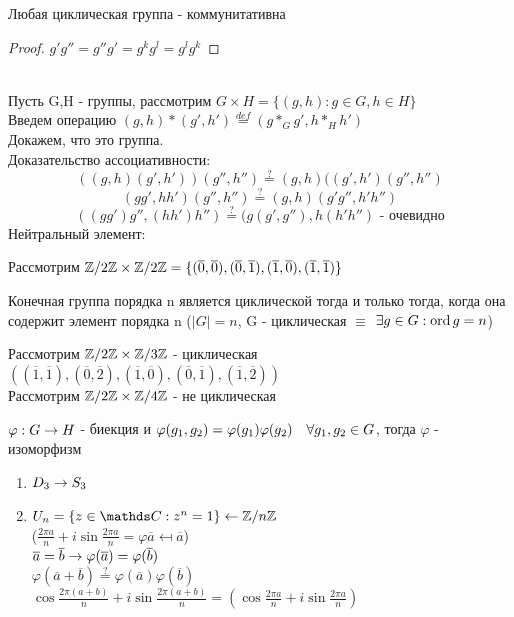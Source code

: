 \documentclass[12pt, fleqn]{article}
\begin{document}
\begin{remark}
    Любая циклическая группа - коммунитативна
\end{remark}

\begin{proof}
    $g' g'' = g'' g' = g^k g^l = g^l g^k$
\end{proof}
\\
Пусть G,H - группы, рассмотрим $G \times H = \{(g,h): g\in G, h\in H\}$\\
Введем операцию $(g,h)*(g',h')\overset{def}{=}(g*_G g', h*_H h')$\\
Докажем, что это группа.\\
Доказательство ассоциативности:
\[((g,h)(g',h'))(g'',h'') \overset{?}{=} (g,h)((g',h')(g'',h'')\]
\[(g g',h h')(g'',h'') \overset{?}{=} (g,h)(g' g'', h' h'')\]
\[((g g')g'',(h h')h'') \overset{?}{=} (g(g',g''),h(h'h'') \text{ - очевидно}\]
Нейтральный элемент:

Рассмотрим $\mathbb{Z} /2 \mathbb{Z} \times \mathbb{Z} /2 \mathbb{Z} = \{(\overline{0},\overline{0}),(\overline{0},\overline{1}),(\overline{1},\overline{0}),(\overline{1},\overline{1})\}$

\begin{utv}
    Конечная группа порядка n является циклической тогда и только тогда, когда она содержит элемент порядка n ($|G|=n$, G - циклическая $\equiv$ $\exists g \in G: \mathop{\rm ord}\nolimits g = n$)
\end{utv}
Рассмотрим $\mathbb{Z} /2 \mathbb{Z} \times \mathbb{Z} /3 \mathbb{Z}$ - циклическая\\
$((\overline{1},\overline{1}), (\overline{0}, \overline{2}), (\overline{1}, \overline{0}), (\overline{0}, \overline{1}), (\overline{1},\overline{2}))$\\
Рассмотрим $\mathbb{Z} /2 \mathbb{Z} \times \mathbb{Z} /4 \mathbb{Z}$ - не циклическая

\begin{definition}
    $\varphi: G \rightarrow H$ - биекция и $\varphi(g_1,g_2)=\varphi(g_1) \varphi(g_2)\quad \forall g_1,g_2 \in G$, тогда $\varphi$ - изоморфизм 
\end{definition}

\begin{instance}
    \begin{enumerate}
        \item $D_3 \rightarrow S_3$
        \item $U_n=\{z\in \CC: z^n=1\} \la \Z / n \Z$\\
        ($\frac{2\pi a}{n}+i \sin \frac{2\pi a}{n} = \varphi \overline{a} \mapsfrom \overline{a}$)\\
        $\overline{a}=\overline{b} \rightarrow \varphi(\overline{a})=\varphi(\overline{b})$\\
        $\varphi(\overline{a}+\overline{b}) \overset{?}{=} \varphi(\overline{a})\varphi(\overline{b})$\\
        $\cos \frac{2\pi(a+b)}{n}+i \sin \frac{2\pi(a+b)}{n}=(\cos\frac{2\pi a}{n} + i \sin \frac{2\pi a}{n}) $
    \end{enumerate}
\end{instance}
\end{document}
